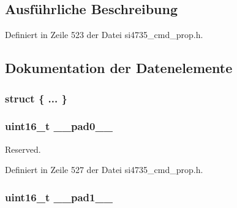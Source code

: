 \subsection{Ausführliche Beschreibung}


Definiert in Zeile 523 der Datei si4735\+\_\+cmd\+\_\+prop.\+h.



\subsection{Dokumentation der Datenelemente}
\hypertarget{unionfm__rsq__int__source_a00387b14b54ff88b1cfbfbea76c39d73}{}\subsubsection[{"@57}]{\setlength{\rightskip}{0pt plus 5cm}struct \{ ... \} }\label{unionfm__rsq__int__source_a00387b14b54ff88b1cfbfbea76c39d73}
\hypertarget{unionfm__rsq__int__source_a77132c2c26a75f5b8751b235cda23828}{}
\subsubsection[{\+\_\+\+\_\+pad0\+\_\+\+\_\+}]{\setlength{\rightskip}{0pt plus 5cm}uint16\+\_\+t \+\_\+\+\_\+pad0\+\_\+\+\_\+}\label{unionfm__rsq__int__source_a77132c2c26a75f5b8751b235cda23828}


Reserved. 



Definiert in Zeile 527 der Datei si4735\+\_\+cmd\+\_\+prop.\+h.

\hypertarget{unionfm__rsq__int__source_ab72e3a1f2f7db8695c60c658f5a0f11a}{}
\subsubsection[{\+\_\+\+\_\+pad1\+\_\+\+\_\+}]{\setlength{\rightskip}{0pt plus 5cm}uint16\+\_\+t \+\_\+\+\_\+pad1\+\_\+\+\_\+}\label{unionfm__rsq__int__source_ab72e3a1f2f7db8695c60c658f5a0f11a}



